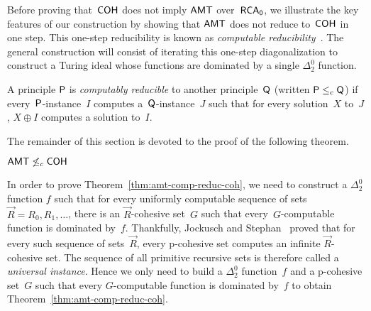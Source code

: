 
Before proving that~$\operatorname{\sf{COH}}$ does not imply $\operatorname{\sf{AMT}}$ over~$\operatorname{\sf{RCA}_0}$,
we illustrate the key features of our construction by 
showing that $\operatorname{\sf{AMT}}$ does not reduce to~$\operatorname{\sf{COH}}$ in one step.
This one-step reducibility is known as \emph{computable reducibility}~\cite{DzhafarovStrong,Hirschfeldt2016notions,Patey2016weakness}.
The general construction will consist of iterating this 
one-step diagonalization to construct a Turing ideal
whose functions are dominated by a single $\Delta^0_2$ function.

\begin{definition}
A principle $\mathsf{P}$ is \emph{computably reducible} to another principle~$\mathsf{Q}$ (written $\mathsf{P} \leq_c \mathsf{Q}$)
if every~$\mathsf{P}$-instance~$I$ computes a~$\mathsf{Q}$-instance~$J$ such that for every solution~$X$ to~$J$,
$X \oplus I$ computes a solution to~$I$.
\end{definition}

The remainder of this section is devoted to the proof of the following theorem.

\begin{theorem}\label{thm:amt-comp-reduc-coh}
$\operatorname{\sf{AMT}} \not \leq_c \operatorname{\sf{COH}}$
\end{theorem}

In order to prove Theorem~\ref{thm:amt-comp-reduc-coh},
we need to construct a $\Delta^0_2$ function $f$ such that 
for every uniformly computable sequence of sets~$\vec{R} = R_0, R_1, \dots$,
there is an $\vec{R}$-cohesive set~$G$ such that every~$G$-computable
function is dominated by~$f$. Thankfully, Jockusch and Stephan~\cite{Jockusch1993cohesive}
proved that for every such sequence of sets~$\vec{R}$, 
every p-cohesive set computes an infinite $\vec{R}$-cohesive set.
The sequence of all primitive recursive sets is therefore called a \emph{universal instance}.
Hence we only need to build a $\Delta^0_2$ function~$f$ and a p-cohesive set~$G$
such that every $G$-computable function is dominated by~$f$ to obtain Theorem~\ref{thm:amt-comp-reduc-coh}.

